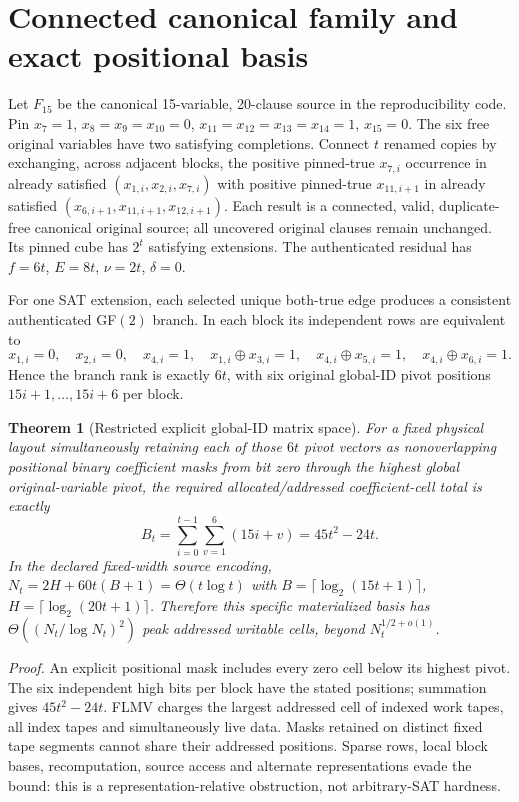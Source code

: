 \documentclass[11pt]{article}
\newtheorem{theorem}{Theorem}
\begin{document}
\section{Connected canonical family and exact positional basis}
Let $F_{15}$ be the canonical 15-variable, 20-clause source in the reproducibility code. Pin $x_7=1$, $x_8=x_9=x_{10}=0$, $x_{11}=x_{12}=x_{13}=x_{14}=1$, $x_{15}=0$. The six free original variables have two satisfying completions. Connect $t$ renamed copies by exchanging, across adjacent blocks, the positive pinned-true $x_{7,i}$ occurrence in already satisfied $(x_{1,i},x_{2,i},x_{7,i})$ with positive pinned-true $x_{11,i+1}$ in already satisfied $(x_{6,i+1},x_{11,i+1},x_{12,i+1})$. Each result is a connected, valid, duplicate-free canonical original source; all uncovered original clauses remain unchanged. Its pinned cube has $2^t$ satisfying extensions. The authenticated residual has $f=6t$, $E=8t$, $\nu=2t$, $\delta=0$.

For one SAT extension, each selected unique both-true edge produces a consistent authenticated GF$(2)$ branch. In each block its independent rows are equivalent to
\[
x_{1,i}=0,\quad x_{2,i}=0,\quad x_{4,i}=1,\quad
x_{1,i}\oplus x_{3,i}=1,\quad
x_{4,i}\oplus x_{5,i}=1,\quad
x_{4,i}\oplus x_{6,i}=1.
\]
Hence the branch rank is exactly $6t$, with six original global-ID pivot positions $15i+1,\ldots,15i+6$ per block.

\begin{theorem}[Restricted explicit global-ID matrix space]
For a fixed physical layout simultaneously retaining each of those $6t$ pivot vectors as nonoverlapping positional binary coefficient masks from bit zero through the highest global original-variable pivot, the required allocated/addressed coefficient-cell total is exactly
\[
B_t=\sum_{i=0}^{t-1}\sum_{v=1}^6(15i+v)=45t^2-24t.
\]
In the declared fixed-width source encoding, $N_t=2H+60t(B+1)=\Theta(t\log t)$ with $B=\lceil\log_2(15t+1)\rceil$, $H=\lceil\log_2(20t+1)\rceil$. Therefore this specific materialized basis has $\Theta((N_t/\log N_t)^2)$ peak addressed writable cells, beyond $N_t^{1/2+o(1)}$.
\end{theorem}
\noindent\textit{Proof.} An explicit positional mask includes every zero cell below its highest pivot. The six independent high bits per block have the stated positions; summation gives $45t^2-24t$. FLMV charges the largest addressed cell of indexed work tapes, all index tapes and simultaneously live data. Masks retained on distinct fixed tape segments cannot share their addressed positions. Sparse rows, local block bases, recomputation, source access and alternate representations evade the bound: this is a representation-relative obstruction, not arbitrary-SAT hardness.
\end{document}

